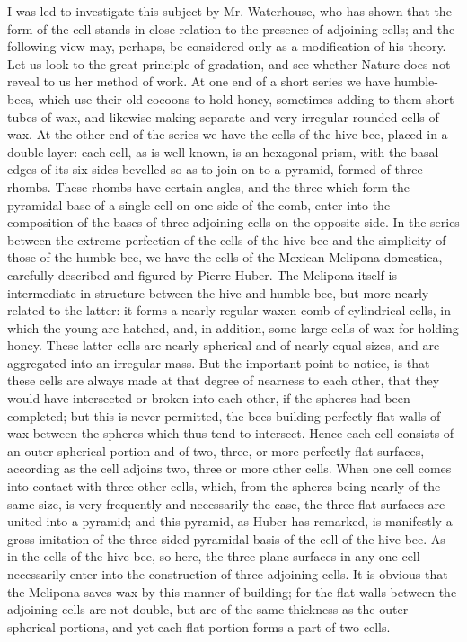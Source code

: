 I was led to investigate this subject by Mr. Waterhouse, who has shown that the form of the cell stands in close relation to the presence of adjoining cells; and the following view may, perhaps, be considered only as a modification of his theory. Let us look to the great principle of gradation, and see whether Nature does not reveal to us her method of work. At one end of a short series we have humble-bees, which use their old cocoons to hold honey, sometimes adding to them short tubes of wax, and likewise making separate and very irregular rounded cells of wax. At the other end of the series we have the cells of the hive-bee, placed in a double layer: each cell, as is well known, is an hexagonal prism, with the basal edges of its six sides bevelled so as to join on to a pyramid, formed of three rhombs. These rhombs have certain angles, and the three which form the pyramidal base of a single cell on one side of the comb, enter into the composition of the bases of three adjoining cells on the opposite side. In the series between the extreme perfection of the cells of the hive-bee and the simplicity of those of the humble-bee, we have the cells of the Mexican Melipona domestica, carefully described and figured by Pierre Huber. The Melipona itself is intermediate in structure between the hive and humble bee, but more nearly related to the latter: it forms a nearly regular waxen comb of cylindrical cells, in which the young are hatched, and, in addition, some large cells of wax for holding honey. These latter cells are nearly spherical and of nearly equal sizes, and are aggregated into an irregular mass. But the important point to notice, is that these cells are always made at that degree of nearness to each other, that they would have intersected or broken into each other, if the spheres had been completed; but this is never permitted, the bees building perfectly flat walls of wax between the spheres which thus tend to intersect. Hence each cell consists of an outer spherical portion and of two, three, or more perfectly flat surfaces, according as the cell adjoins two, three or more other cells. When one cell comes into contact with three other cells, which, from the spheres being nearly of the same size, is very frequently and necessarily the case, the three flat surfaces are united into a pyramid; and this pyramid, as Huber has remarked, is manifestly a gross imitation of the three-sided pyramidal basis of the cell of the hive-bee. As in the cells of the hive-bee, so here, the three plane surfaces in any one cell necessarily enter into the construction of three adjoining cells. It is obvious that the Melipona saves wax by this manner of building; for the flat walls between the adjoining cells are not double, but are of the same thickness as the outer spherical portions, and yet each flat portion forms a part of two cells.
